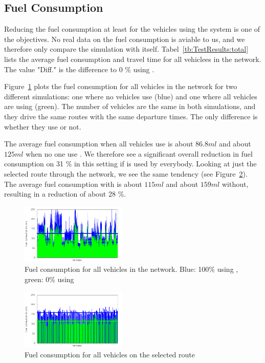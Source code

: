 \subsection{Fuel Consumption}
Reducing the fuel consumption at least for the vehicles using the system is one of the objectives.
No real data on the fuel consumption is aviable to us, and we therefore only compare the simulation with itself. 
Tabel~\ref{tb:TestResults:total} lists the average fuel consumption and travel time for all vehiclees in the network. 
The value "Diff." is the difference to 0 \% using \tech.

Figure~\ref{fig:TestResults:fuelTotal} plots the fuel consumption for all vehicles in the network for two different simulations: one where no vehicles use \tech (blue) and one where all vehicles are using \tech (green).
The number of vehicles are the same in both simulations, and they drive the same routes with the same departure times. 
The only difference is whether they use \tech or not.

The average fuel consumption when all vehicles use \tech is about $86.8 ml$ and about $125 ml$ when no one use \tech.
We therefore see a significant overall reduction in fuel consumption on 31 \% in this setting if \tech is used by everybody.
Looking at just the selected route through the network, we see the same tendency (see Figure~\ref{fig:TestResults:fuelRoute}). 
The average fuel consumption with \tech is about $115 ml$ and about $159 ml$ without, resulting in a reduction of about 28 \%.
\begin{figure}[htb]
\includegraphics[width=0.45\textwidth]{../images/tp0c0_8/fuelTotal.png}
\caption{Fuel consumption for all vehicles in the network. Blue: 100\% using \tech, green: 0\% using \tech}
\label{fig:TestResults:fuelTotal}
\end{figure}

\begin{figure}[htb]
\includegraphics[width=0.45\textwidth]{../images/tp0c0_8/fuelRoute.png}
\caption{Fuel consumption for all vehicles on the selected route}
\label{fig:TestResults:fuelRoute}
\end{figure}

